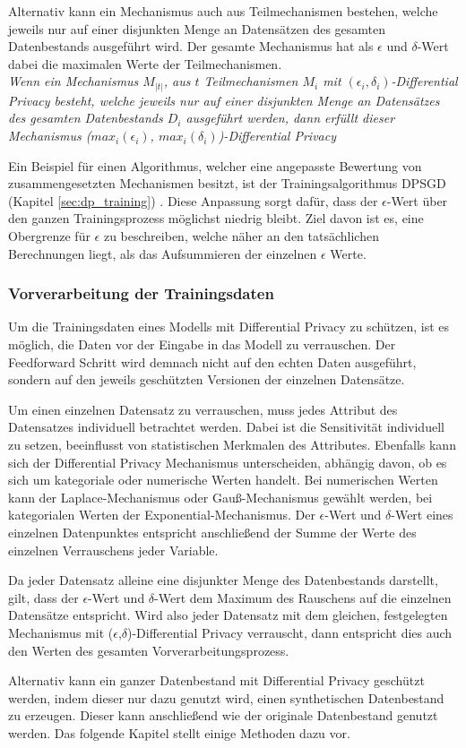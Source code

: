 Alternativ kann ein Mechanismus auch aus Teilmechanismen bestehen, welche jeweils nur auf einer disjunkten Menge an Datensätzen des gesamten Datenbestands ausgeführt wird.
Der gesamte Mechanismus hat als $\epsilon$ und $\delta$-Wert dabei die maximalen Werte der Teilmechanismen.\\
\textit{
    Wenn ein Mechanismus $M_{|t|}$, aus $t$ Teilmechanismen $M_i$ mit $(\epsilon_i,\delta_i)$-Differential Privacy besteht, welche jeweils 
    nur auf einer disjunkten Menge an Datensätzes des gesamten Datenbestands $D_i$ ausgeführt werden, 
    dann erfüllt dieser Mechanismus ($max_i(\epsilon_{i})$, $max_i(\delta_{i})$)-Differential Privacy
}


Ein Beispiel für einen Algorithmus, welcher eine angepasste Bewertung von zusammengesetzten Mechanismen besitzt, ist der Trainingsalgorithmus DPSGD (Kapitel \ref{sec:dp_training}) \cite{P-28}.
Diese Anpassung sorgt dafür, dass der $\epsilon$-Wert über den ganzen Trainingsprozess möglichst niedrig bleibt.
Ziel davon ist es, eine Obergrenze für $\epsilon$ zu beschreiben, welche näher an den tatsächlichen Berechnungen liegt, als das Aufsummieren der einzelnen $\epsilon$ Werte.


\subsubsection*{Vorverarbeitung der Trainingsdaten}
Um die Trainingsdaten eines Modells mit Differential Privacy zu schützen, ist es möglich, die Daten vor der Eingabe in das Modell zu verrauschen.
Der Feedforward Schritt wird demnach nicht auf den echten Daten ausgeführt, sondern auf den jeweils geschützten Versionen der einzelnen Datensätze.

Um einen einzelnen Datensatz zu verrauschen, muss jedes Attribut des Datensatzes individuell betrachtet werden. 
Dabei ist die Sensitivität individuell zu setzen, beeinflusst von statistischen Merkmalen des Attributes.
Ebenfalls kann sich der Differential Privacy Mechanismus unterscheiden, abhängig davon, ob es sich um kategoriale oder numerische Werten handelt.
Bei numerischen Werten kann der Laplace-Mechanismus oder Gauß-Mechanismus gewählt werden, bei kategorialen Werten der Exponential-Mechanismus.
Der $\epsilon$-Wert und $\delta$-Wert eines einzelnen Datenpunktes entspricht anschließend der Summe der Werte des einzelnen Verrauschens jeder Variable.

Da jeder Datensatz alleine eine disjunkter Menge des Datenbestands darstellt, gilt, dass der $\epsilon$-Wert und $\delta$-Wert dem Maximum des Rauschens auf die einzelnen Datensätze entspricht.
Wird also jeder Datensatz mit dem gleichen, festgelegten Mechanismus mit ($\epsilon$,$\delta$)-Differential Privacy verrauscht, dann entspricht dies auch den Werten des gesamten Vorverarbeitungsprozess.

Alternativ kann ein ganzer Datenbestand mit Differential Privacy geschützt werden, indem dieser nur dazu genutzt wird, einen synthetischen Datenbestand zu erzeugen.
Dieser kann anschließend wie der originale Datenbestand genutzt werden.
Das folgende Kapitel stellt einige Methoden dazu vor.

